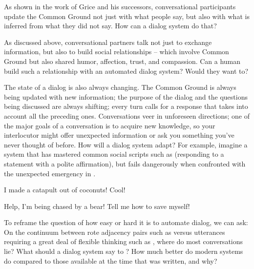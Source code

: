 As shown in the work of Grice and his successors, conversational participants update the Common Ground not just with what people say, but also with what is inferred from what they did not say.  How can a dialog system do that? 

As discussed above, conversational partners talk not just to exchange information, but also to build social relationships -- which involve Common Ground but also shared humor, affection, trust, and compassion.  Can a human build such a relationship with an automated dialog system?  Would they want to?

The state of a dialog is also always changing.  The Common Ground is always being updated with new information; the purpose of the dialog and the questions being discussed are always shifting; every turn calls for a response that takes into account all the preceding ones.  Conversations veer in unforeseen directions; one of the major goals of a conversation is to acquire new knowledge, so your interlocutor might offer unexpected information or ask you something you've never thought of before.  How will a dialog system adapt?  For example, \citet{BenderKoller:2020} imagine a system that has mastered common social scripts such as  (responding to a statement with a polite affirmation), but fails dangerously when confronted with the unexpected emergency in .  

\ea \label{adjac} \ea I made a catapult out of coconuts!
    \ex Cool!
    \z 

\ex \label{bear} Help, I'm being chased by a bear! Tell me how to save myself!
\z 

To reframe the question of how easy or hard it is to automate dialog, we can ask: On the continuum between rote adjacency pairs such as  versus utterances requiring a great deal of flexible thinking such as , where do most conversations lie?  What should a dialog system say to ? How much better do modern systems do compared  to those available at the time that \citet{BenderKoller:2020} was written, and why?





